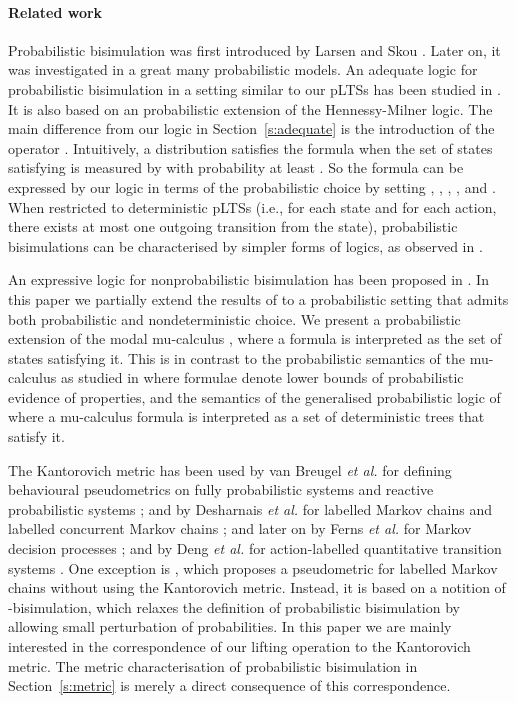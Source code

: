 \documentclass{article}
\begin{document}
\paragraph{Related work}
Probabilistic bisimulation was first introduced by Larsen and Skou
\cite{LS91}. Later on, it was investigated in a great many
probabilistic models.
An adequate logic for probabilistic bisimulation in a setting similar to our pLTSs has
been studied in \cite{JWL01,PS07}. It is also based on an probabilistic
extension of the Hennessy-Milner logic. The main difference from our
logic in Section~\ref{s:adequate} is the introduction of the
operator . Intuitively, a distribution 
satisfies the formula  when the set of states satisfying
 is measured by  with probability at least . So the
formula  can be expressed by our logic in terms of the
probabilistic choice  by setting
, , , , and .
When restricted to
deterministic pLTSs (i.e., for each state and for each action, there
exists at most one outgoing transition from the state),
probabilistic bisimulations can be characterised by simpler forms of
logics, as observed in \cite{LS91,DEP98,PS07}.

An expressive logic for nonprobabilistic bisimulation has been proposed in \cite{SI94}.
 In this paper we partially extend the results of
\cite{SI94} to a probabilistic setting that admits both
probabilistic and nondeterministic choice. We present a
probabilistic extension of the modal mu-calculus \cite{Koz83}, where
a formula is interpreted as the set of states satisfying it. This is
in contrast to the probabilistic semantics of the mu-calculus as
studied in
 \cite{HK97,MM97,MM07} where formulae denote lower bounds of
probabilistic evidence of properties, and the semantics of the
generalised probabilistic logic of \cite{CIN05} where a mu-calculus
formula is interpreted as a set of deterministic trees that satisfy
it.

The Kantorovich metric has been used by van Breugel \emph{et al.}
for defining behavioural pseudometrics on fully probabilistic
systems \cite{BW01,BW06,BSW07} and reactive probabilistic systems
\cite{BW01b,BW05,BHMW05,BHMW07}; and by Desharnais {\em et al.} for
labelled Markov chains \cite{DGJP99,DGJP04} and labelled concurrent
Markov chains \cite{DGJP02}; and later on by Ferns \emph{et al.} for
Markov decision processes \cite{FPP04,FPP05}; and by Deng \emph{et
al.} for action-labelled quantitative transition systems
\cite{DCPP05}.  One exception is \cite{DLT08}, which proposes a
pseudometric for labelled Markov chains without using the Kantorovich
metric.  Instead, it is based on a notition of -bisimulation, which
relaxes the definition of probabilistic bisimulation by allowing small
perturbation of probabilities.
In this paper we are mainly interested in the
correspondence of our lifting operation to the Kantorovich metric.
The metric characterisation of probabilistic bisimulation in
Section~\ref{s:metric} is merely a direct consequence of this
correspondence.
\end{document}
